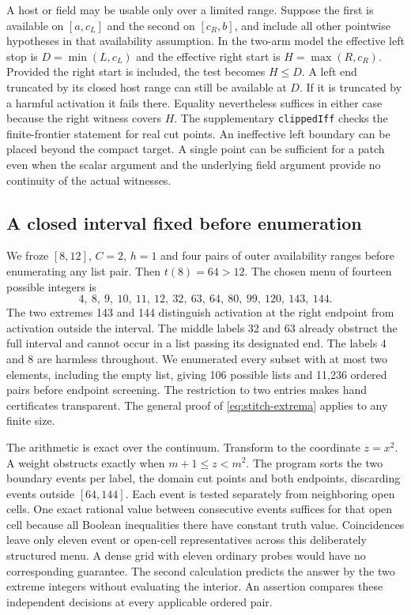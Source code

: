 \documentclass[12pt,letterpaper]{article}
\begin{document}
A host or field may be usable only over a limited range. Suppose the first is available on \([a,c_L]\) and the second on \([c_R,b]\), and include all other pointwise hypotheses in that availability assumption. In the two-arm model the effective left stop is \(D=\min(L,c_L)\) and the effective right start is \(H=\max(R,c_R)\). Provided the right start is included, the test becomes \(H\le D\). A left end truncated by its closed host range can still be available at \(D\). If it is truncated by a harmful activation it fails there. Equality nevertheless suffices in either case because the right witness covers \(H\). The supplementary \texttt{clippedIff} checks the finite-frontier statement for real cut points. An ineffective left boundary can be placed beyond the compact target. A single point can be sufficient for a patch even when the scalar argument and the underlying field argument provide no continuity of the actual witnesses.

\subsection{A closed interval fixed before enumeration}
We froze \([8,12]\), \(C=2\), \(h=1\) and four pairs of outer availability ranges before enumerating any list pair. Then \(t(8)=64>12\). The chosen menu of fourteen possible integers is
\[
  4,\ 8,\ 9,\ 10,\ 11,\ 12,\ 32,\ 63,\ 64,\ 80,\ 99,\ 120,\ 143,\ 144 .
\]
The two extremes 143 and 144 distinguish activation at the right endpoint from activation outside the interval. The middle labels 32 and 63 already obstruct the full interval and cannot occur in a list passing its designated end. The labels 4 and 8 are harmless throughout. We enumerated every subset with at most two elements, including the empty list, giving 106 possible lists and 11,236 ordered pairs before endpoint screening. The restriction to two entries makes hand certificates transparent. The general proof of \eqref{eq:stitch-extrema} applies to any finite size.

The arithmetic is exact over the continuum. Transform to the coordinate \(z=x^2\). A weight obstructs exactly when \(m+1\le z<m^2\). The program sorts the two boundary events per label, the domain cut points and both endpoints, discarding events outside \([64,144]\). Each event is tested separately from neighboring open cells. One exact rational value between consecutive events suffices for that open cell because all Boolean inequalities there have constant truth value. Coincidences leave only eleven event or open-cell representatives across this deliberately structured menu. A dense grid with eleven ordinary probes would have no corresponding guarantee. The second calculation predicts the answer by the two extreme integers without evaluating the interior. An assertion compares these independent decisions at every applicable ordered pair.
\end{document}
